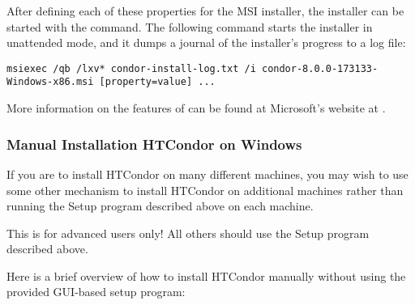 After defining each of these properties for the MSI installer, the
installer can be started with the  command. The following
command starts the installer in unattended mode, and it dumps a journal of
the installer's progress to a log file:
\footnotesize
\begin{verbatim}
msiexec /qb /lxv* condor-install-log.txt /i condor-8.0.0-173133-Windows-x86.msi [property=value] ... 
\end{verbatim}
\normalsize

More information on the features of 
can be found at Microsoft's website at
.

\subsubsection{\label{sec:NT-Manual-Install}Manual Installation HTCondor on Windows}

If you are to install HTCondor on many different machines, you may wish
to use some other mechanism to install HTCondor on additional machines
rather than running the Setup program described above on each machine.

\Warn This is for advanced users only!  All others should use the Setup program described above. 

Here is a brief overview of how to install HTCondor manually without using the provided GUI-based setup program:

